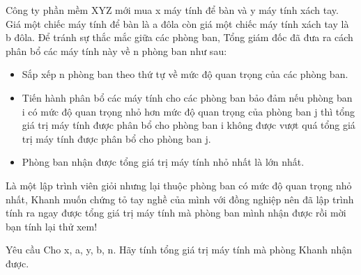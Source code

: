 Công ty phần mềm XYZ mới mua x máy tính để bàn và y máy tính xách tay. Giá một chiếc máy tính để bàn là a đôla còn giá một chiếc máy tính xách tay là b đôla. Để tránh sự thắc mắc giữa các phòng ban, Tổng giám đốc đã đưa ra cách phân bổ các máy tính này về n phòng ban như sau:  
\begin{itemize}
	\item     Sắp xếp n phòng ban theo thứ tự về mức độ quan trọng của các phòng ban.   
	\item     Tiến hành phân bổ các máy tính cho các phòng ban bảo đảm nếu phòng ban i có mức độ quan trọng nhỏ hơn mức độ quan trọng của phòng ban j thì tổng giá trị máy tính được phân bổ cho phòng ban i không được vượt quá tổng giá trị máy tính được phân bổ cho phòng ban j.   
	\item     Phòng ban nhận được tổng giá trị máy tính nhỏ nhất là lớn nhất.   
\end{itemize}

   Là một lập trình viên giỏi nhưng lại thuộc phòng ban có mức độ quan trọng nhỏ nhất, Khanh muốn chứng tỏ tay nghề của mình với đồng nghiệp nên đã lập trình tính ra ngay được tổng giá trị máy tính mà phòng ban mình nhận được rồi mời bạn tính lại thử xem!  

Yêu cầu
Cho x, a, y, b, n. Hãy tính tổng giá trị máy tính mà phòng Khanh nhận được.